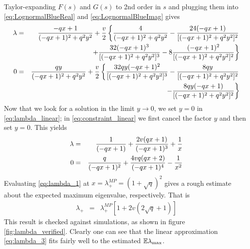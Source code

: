 \documentclass{article}
\begin{document}
Taylor-expanding $F(s)$ and $G(s)$ to 2nd order in $s$ and plugging
them into \eqref{eq:LognormalBlueReal} and
\eqref{eq:LognormalBlueImag} gives
\begin{eqnarray}
\lambda &=& {-q x+1 \over (-q x+1)^2+q^2 y^2} + {v \over 2}\left\{
{4 \over (-q x+1)^2+q^2 y^2} -{24 (-q x+1) \over
  [(-q x+1)^2+q^2 y^2]^2} \right. \nonumber \\
&& \left. + {32 (-q x+1)^3 \over [(-q x+1)^2+q^2 y^2]^3} -8 {(-q
    x+1)^2 \over [(-q x+1)^2+q^2 y^2]^2}
\right\} \label{eq:lambda_linear}\\
0 &=& {q y \over (-q x+1)^2+q^2 y^2} + {v \over 2} \left\{
  {32 q y (-q x+1)^2 \over [(-q x+1)^2+q^2 y^2]^3}
  -{8 q y \over [(-q x+1)^2+q^2 y^2]^2} \right. \nonumber \\
  && \left.
    -{8 q y (-q x+1) \over [(-q x+1)^2+q^2 y^2]^2}
\right\} \label{eq:constraint_linear}
\end{eqnarray}
Now that we look for a solution in the limit $y \to 0$, we set $y = 0$
in \eqref{eq:lambda_linear}; in \eqref{eq:constraint_linear} we first
cancel the factor $y$ and then set $y = 0$. This yields
\begin{eqnarray}
  \lambda &=& {1 \over (-q x+1)} + {2 v (q x+1) \over (-q x+1)^3} + {1
    \over x} \label{eq:lambda_1} \\
  0 &=& {q \over (-q x+1)^2} + {4 v q(q x+2) \over (-q x+1)^4} - {1
    \over x^2} \label{eq:constraint_1}
\end{eqnarray}
Evaluating \eqref{eq:lambda_1} at $x = \lambda^{MP}_{+} = (1 +
\sqrt{q})^2$ gives a rough estimate about the expected maximum
eigenvalue, respectively. That is
\begin{eqnarray}
  \lambda_{+} &=& \lambda_{+}^{MP} [1+2v(2\sqrt q +
  1)] \label{eq:lambda_3}
\end{eqnarray}
This result is checked against simulations, as shown in figure
\ref{fig:lambda_verified}. Clearly one can see that the linear
approximation \eqref{eq:lambda_3} fits fairly well to the estimated
$\mathbb{E} \lambda_{\text{max}}$.
\end{document}
